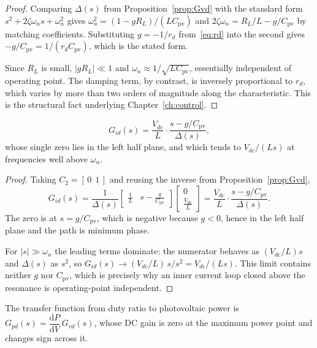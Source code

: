 \begin{proof}
Comparing $\Delta(s)$ from Proposition~\ref{prop:Gvd} with the standard form
$s^2 + 2\zeta\omega_n s + \omega_n^2$ gives $\omega_n^2 = (1-gR_L)/(LC_{\mathrm{pv}})$
and $2\zeta\omega_n = R_L/L - g/C_{\mathrm{pv}}$ by matching coefficients.
Substituting $g = -1/r_d$ from~\eqref{eq:rd} into the second gives
$-g/C_{\mathrm{pv}} = 1/(r_d C_{\mathrm{pv}})$, which is the stated form.

Since $R_L$ is small, $|gR_L| \ll 1$ and $\omega_n \approx 1/\sqrt{LC_{\mathrm{pv}}}$,
essentially independent of operating point. The damping term, by contrast, is
inversely proportional to $r_d$, which varies by more than two orders of
magnitude along the characteristic. This is the structural fact underlying
Chapter~\ref{ch:control}.
\end{proof}

\begin{proposition}
\label{prop:Gid}
\[
G_{id}(s) = \frac{V_{dc}}{L}\cdot\frac{s - g/C_{\mathrm{pv}}}{\Delta(s)},
\]
whose single zero lies in the left half plane, and which tends to
$V_{dc}/(Ls)$ at frequencies well above $\omega_n$.
\end{proposition}

\begin{proof}
Taking $C_2 = [\,0\ \ 1\,]$ and reusing the inverse from
Proposition~\ref{prop:Gvd},
\[
G_{id}(s) = \frac{1}{\Delta(s)}\begin{bmatrix} \tfrac{1}{L} & s - \tfrac{g}{C_{\mathrm{pv}}}\end{bmatrix}
\begin{bmatrix} 0 \\ \tfrac{V_{dc}}{L}\end{bmatrix}
= \frac{V_{dc}}{L}\cdot\frac{s - g/C_{\mathrm{pv}}}{\Delta(s)} .
\]
The zero is at $s = g/C_{\mathrm{pv}}$, which is negative because $g < 0$, hence
in the left half plane and the path is minimum phase.

For $|s| \gg \omega_n$ the leading terms dominate: the numerator behaves as
$(V_{dc}/L)s$ and $\Delta(s)$ as $s^2$, so
$G_{id}(s) \to (V_{dc}/L)\,s/s^2 = V_{dc}/(Ls)$. This limit contains neither $g$
nor $C_{\mathrm{pv}}$, which is precisely why an inner current loop closed above
the resonance is operating-point independent.
\end{proof}

\begin{proposition}
\label{prop:vanishing}
The transfer function from duty ratio to photovoltaic power is
$G_{pd}(s) = \dfrac{\mathrm{d}P}{\mathrm{d}V}\,G_{vd}(s)$, whose DC gain is zero
at the maximum power point and changes sign across it.
\end{proposition}

